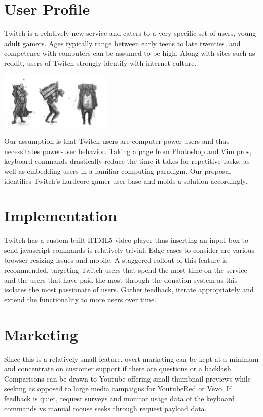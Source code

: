 \documentclass[11pt, letterpaper, UTF-8]{article}
\begin{document}
\section{User Profile}
Twitch is a relatively new service and caters to a very specific set of users, young adult gamers. Ages typically range between early teens to late twenties, and competence with computers can be assumed to be high. Along with sites such as reddit, users of Twitch strongly identify with internet culture.\\

\begin{center}
\includegraphics[width=0.4\textwidth]{gamer.png}
\end{center}
\newpage
Our assumption is that Twitch users are computer power-users and thus necessitates power-user behavior. Taking a page from Photoshop and Vim pros, keyboard commands drastically reduce the time it takes for repetitive tasks, as well as embedding users in a familiar computing paradigm. Our proposal identifies Twitch's hardcore gamer user-base and molds a solution accordingly.\\
\section{Implementation}
Twitch has a custom built HTML5 video player thus inserting an input box to send javascript commands is relatively trivial. Edge cases to consider are various browser resizing issues and mobile. A staggered rollout of this feature is recommended, targeting Twitch users that spend the most time on the service and the users that have paid the most through the donation system as this isolates the most passionate of users. Gather feedback, iterate appropriately and extend the functionality to more users over time.\\

\section{Marketing}
Since this is a relatively small feature, overt marketing can be kept at a minimum and concentrate on customer support if there are questions or a backlash. Comparisons can be drawn to Youtube offering small thumbnail previews while seeking as opposed to large media campaigns for YoutubeRed or Vevo. If feedback is quiet, request surveys and monitor usage data of the keyboard commands vs manual mouse seeks through request payload data.\\
\end{document}
